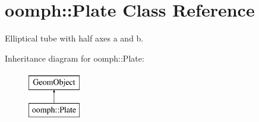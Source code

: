 \hypertarget{classoomph_1_1Plate}{}\section{oomph\+:\+:Plate Class Reference}
\label{classoomph_1_1Plate}


Elliptical tube with half axes a and b.  


Inheritance diagram for oomph\+:\+:Plate\+:\begin{figure}[H]
\begin{center}
\leavevmode
\includegraphics[height=2.000000cm]{classoomph_1_1Plate}
\end{center}
\end{figure}
